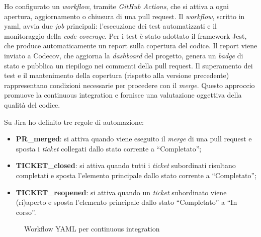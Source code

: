 \par Ho configurato un \textit{workflow}, tramite \textit{GitHub Actions}, che si attiva a ogni apertura, aggiornamento o chiusura di una \gls{pull request}. Il \textit{workflow}, scritto in \gls{yaml}, avvia due \textit{job} principali: l’esecuzione dei test automatizzati e il monitoraggio della \textit{code coverage}. Per i test è stato adottato il \gls{framework} Jest, che produce automaticamente un report sulla copertura del codice. Il report viene inviato a Codecov, che aggiorna la \textit{dashboard} del progetto, genera un \textit{badge} di stato e pubblica un riepilogo nei commenti della pull request. Il superamento dei test e il mantenimento della copertura (rispetto alla versione precedente) rappresentano condizioni necessarie per procedere con il \textit{merge}. Questo approccio promuove la \gls{continuous integration} e fornisce una valutazione oggettiva della qualità del codice.

\vspace{10pt}
\par\noindent Su Jira ho definito tre regole di automazione:
\begin{itemize}
  \item \textbf{PR\_merged}: si attiva quando viene eseguito il \textit{merge} di una \gls{pull request} e sposta i \textit{ticket} collegati dallo stato corrente a “Completato”;
  \item \textbf{TICKET\_closed}: si attiva quando tutti i \textit{ticket} subordinati risultano completati e sposta l'elemento principale dallo stato corrente a “Completato”;
  \item \textbf{TICKET\_reopened}: si attiva quando un \textit{ticket} subordinato viene (ri)aperto e sposta l’elemento principale dallo stato “Completato” a “In corso”.
\end{itemize}

\begin{figure}[H] 
  \centering 
  \caption{Workflow YAML per continuous integration}
\end{figure}